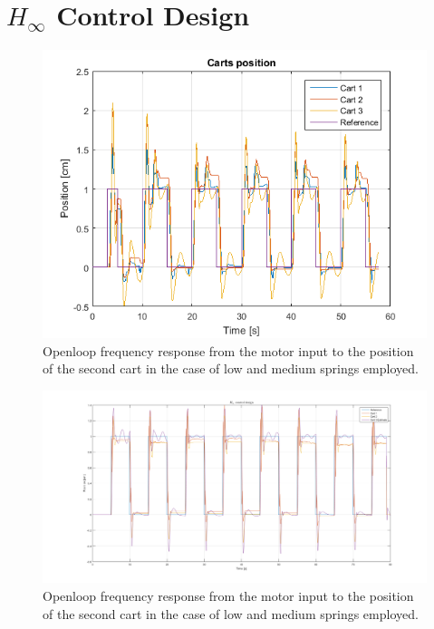 \section{$H_\infty$ Control Design}
\begin{figure}[h]
\centering
\includegraphics[width=0.5\linewidth]{img/hinf1.png}
\caption{Openloop frequency response from the motor input to the position of the second cart in the case of low and medium springs employed.}
\label{fig:hinf13dof}
\end{figure}
\begin{figure}[h]
\centering
\includegraphics[width=0.5\linewidth]{img/hinf2.png}
\caption{Openloop frequency response from the motor input to the position of the second cart in the case of low and medium springs employed.}
\label{fig:hinf23dof}
\end{figure}